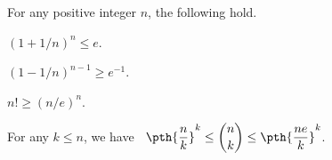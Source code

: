 \begin{lemma}
        For any positive integer $n$, the following hold.
        \smallskip        
        \begin{compactenumi}
            \item $(1+1/n)^n \leq e$.

            \smallskip        
            \item $(1-1/n)^{n-1} \geq e^{-1}$.
            
            \smallskip        
            \item $n! \geq (n/e)^n$.
            
            \smallskip        
            \item  For any $k \leq n$, we have $\;\;\displaystyle
            \pth{\frac{n}{k}}^k \leq \binom{n}{k} \leq \pth{\frac{n
                  e}{k}}^k$.
        \end{compactenumi}
        
    \end{lemma}
